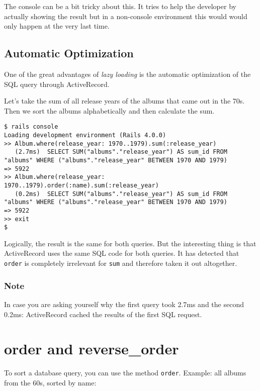 \documentclass[a4paper]{book}
\newcounter{tab}[chapter]
\newcommand{\chap}[1]{\newpage\thispagestyle{empty}\chapter{#1}\label{chap:\thechapter}}
\begin{document}
The console can be a bit tricky about this. It tries to help the developer by actually showing the result but in a non-console environment this would would only happen at the very last time.

\section{Automatic Optimization}\label{automatic-optimization}

One of the great advantages of \emph{lazy loading} is the automatic optimization of the SQL query through ActiveRecord.

Let's take the sum of all release years of the albums that came out in the 70s. Then we sort the albums alphabetically and then calculate the sum.

\begin{shaded}\begin{verbatim}
$ rails console
Loading development environment (Rails 4.0.0)
>> Album.where(release_year: 1970..1979).sum(:release_year)
   (2.7ms)  SELECT SUM("albums"."release_year") AS sum_id FROM "albums" WHERE ("albums"."release_year" BETWEEN 1970 AND 1979)
=> 5922
>> Album.where(release_year: 1970..1979).order(:name).sum(:release_year)
   (0.2ms)  SELECT SUM("albums"."release_year") AS sum_id FROM "albums" WHERE ("albums"."release_year" BETWEEN 1970 AND 1979)
=> 5922
>> exit
$
\end{verbatim}\end{shaded}

Logically, the result is the same for both queries. But the interesting thing is that ActiveRecord uses the same SQL code for both queries. It has detected that \texttt{order} is completely irrelevant for \texttt{sum} and therefore taken it out altogether.

\subsection{Note}\label{note-24}

In case you are asking yourself why the first query took 2.7ms and the second 0.2ms: ActiveRecord cached the results of the first SQL request.

\chap{order and reverse\_order}\label{order-and-reverseux5forder}

To sort a database query, you can use the method \texttt{order}. Example: all albums from the 60s, sorted by name:
\end{document}
